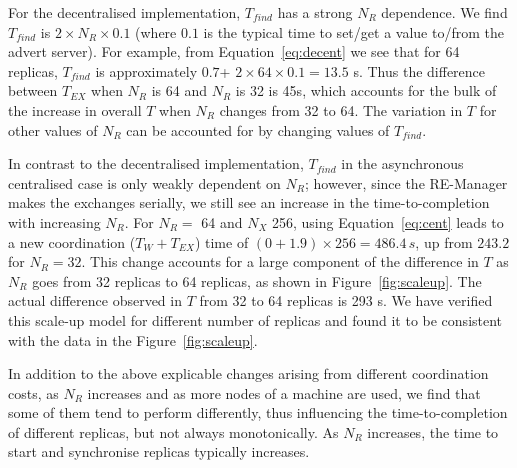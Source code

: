 \documentclass{rspublic}
\newcommand{\jhanote}[1]{ {\textcolor{red} { ***shantenu: #1 }}}
\newcommand{\alnote}[1]{ {\textcolor{blue} { ***andre: #1 }}}
\newcommand{\athotanote}[1]{ {\textcolor{green} { ***athota: #1 }}}
\newcommand{\alnote}[1]{}
\newcommand{\athotanote}[1]{}
\newcommand{\jhanote}[1]{}
\begin{document}
For the decentralised implementation, $T_{find}$ has a strong $N_R$
dependence. We find $T_{find}$ is $2 \times N_R \times 0.1$ (where $0.1$ is
the typical time to set/get a value to/from the advert server).  For
example, from Equation~\ref{eq:decent} we see that for 64 replicas,
$T_{find}$ is approximately $0.7$+ $2 \times 64 \times 0.1 = 13.5$ s.  Thus the
difference between $T_{EX}$ when $N_R$ is 64 and $N_R$ is 32 is 45s, which
accounts for the bulk of the increase in overall $T$ when $N_R$
changes from 32 to 64. %
The variation in $T$ for other values of $N_R$ can be
accounted for by changing values of $T_{find}$.



In contrast to the decentralised implementation, $T_{find}$ in the
asynchronous centralised case is only weakly dependent on $N_R$; however,
since the RE-Manager makes the exchanges serially, we still see an
increase in the time-to-completion with increasing $N_R$. %
For $N_R =$ 64 and $N_X$ 256, using Equation~\ref{eq:cent} leads to a
new coordination ($T_W + T_{EX}$) time of $(0+1.9) \times 256 =
486.4\,s$, up from $243.2$ for $N_R = 32$. This change accounts for a
large component of the difference in $T$ as $N_R$ goes from 32
replicas to 64 replicas, as shown in Figure~\ref{fig:scaleup}. The
actual difference observed in $T$ from 32 to 64 replicas is 293
s. We have verified this scale-up model for different number of replicas and found it to
be consistent with the data in the Figure~\ref{fig:scaleup}.

In addition to the above explicable changes arising from different
coordination costs, as $N_R$ increases and as more nodes of a machine are used, we find that some of them tend to perform differently, thus influencing the time-to-completion
of different replicas, but not always monotonically.  %
As $N_R$ increases, the time to start and synchronise replicas
typically increases.

\end{document}
